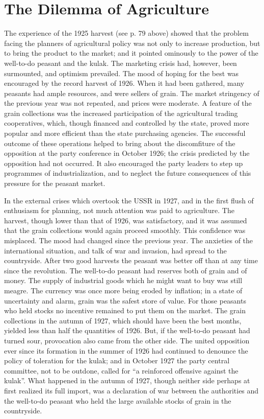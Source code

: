 \chapter{The Dilemma of Agriculture}

The experience of the 1925 harvest (see p. 79 above) showed that the problem facing the planners of agricultural policy was not only to increase production, but to bring the product to the market; and it pointed ominously to the power of the well-to-do peasant and the kulak. The marketing crisis had, however, been surmounted, and optimism prevailed. The mood of hoping for the best was encouraged by the record harvest of 1926. When it had been gathered, many peasants had ample resources, and were sellers of grain. The market stringency of the previous year was not repeated, and prices were moderate. A feature of the grain collections was the increased participation of the agricultural trading cooperatives, which, though financed and controlled by the state, proved more popular and more efficient than the state purchasing agencies. The successful outcome of these operations helped to bring about the discomfiture of the opposition at the party conference in October 1926; the crisis predicted by the opposition had not occurred. It also encouraged the party leaders to step up programmes of industrialization, and to neglect the future consequences of this pressure for the peasant market. 

In the external crises which overtook the USSR in 1927, and in the first flush of enthusiasm for planning, not much attention was paid to agriculture. The harvest, though lower than that of 1926, was satisfactory, and it was assumed that the grain collections would again proceed smoothly. This confidence was misplaced. The mood had changed since the previous year. The anxieties of the international situation, and talk of war and invasion, had spread to the countryside. After two good harvests the peasant was better off than at any time since the revolution. The well-to-do peasant had reserves both of grain and of money. The supply of industrial goods which he might want to buy was still meagre. The currency was once more being eroded by inflation; in a state of uncertainty and alarm, grain was the safest store of value. For those peasants who held stocks no incentive remained to put them on the market. The grain collections in the autumn of 1927, which should have been the best months, yielded less than half the quantities of 1926. But, if the well-to-do peasant had turned sour, provocation also came from the other side. The united opposition ever since its formation in the summer of 1926 had continued to denounce the policy of toleration for the kulak; and in October 1927 the party central committee, not to be outdone, called for ``a reinforced offensive against the kulak''. What happened in the autumn of 1927, though neither side perhaps at first realized its full import, was a declaration of war between the authorities and the well-to-do peasant who held the large available stocks of grain in the countryside. 

